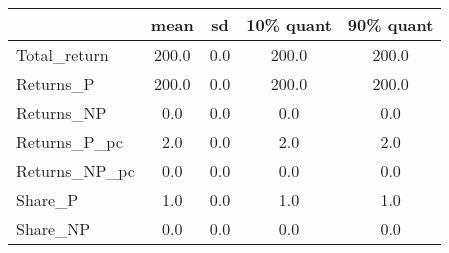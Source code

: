 \begin{tabular}{lcccc}
\toprule
{} &   mean &   sd &  10\% quant &  90\% quant \\
\midrule
Total\_return  &  200.0 &  0.0 &      200.0 &      200.0 \\
Returns\_P     &  200.0 &  0.0 &      200.0 &      200.0 \\
Returns\_NP    &    0.0 &  0.0 &        0.0 &        0.0 \\
Returns\_P\_pc  &    2.0 &  0.0 &        2.0 &        2.0 \\
Returns\_NP\_pc &    0.0 &  0.0 &        0.0 &        0.0 \\
Share\_P       &    1.0 &  0.0 &        1.0 &        1.0 \\
Share\_NP      &    0.0 &  0.0 &        0.0 &        0.0 \\
\bottomrule
\end{tabular}
